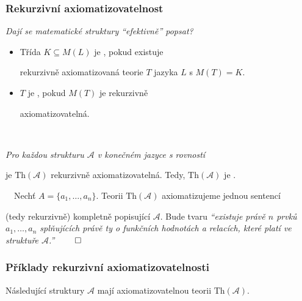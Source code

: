 \subsubsection*{Rekurzivní axiomatizovatelnost}
    {\it Dají se matematické struktury ``efektivně'' popsat?}
    \smallskip
    
    \begin{itemize}
    \item Třída $K\subseteq M(L)$ je , pokud existuje
    \smallskip
    
    rekurzivně axiomatizovaná teorie $T$ jazyka $L$ s $M(T)=K$.
    \smallskip
    
    \item {} $T$ je , pokud $M(T)$ je
    rekurzivně
    \smallskip
    
    axiomatizovatelná.
    \end{itemize}
    
    \medskip
    
    \smallskip
    
    {\bf {}}\ \ {\it Pro každou  strukturu $\mathcal{A}$ v konečném jazyce s rovností
    \smallskip
    
    je $\mathrm{Th}(\mathcal{A})$ rekurzivně axiomatizovatelná. Tedy, $\mathrm{Th}(\mathcal{A})$ je .}
    \medskip
    
    \smallskip
    
    {\it {}}\ \ Nechť $A=\{a_1,\dots,a_n\}$. Teorii $\mathrm{Th}(\mathcal{A})$ axiomatizujeme jednou sentencí
    \smallskip
    
    (tedy rekurzivně) kompletně popisující $\mathcal{A}$. Bude tvaru \emph{``existuje právě $n$ prvků   
    $a_1,\dots,a_n$ splňujících právě ty  o funkčních hodnotách a relacích, které platí ve struktuře $\mathcal{A}$.''} $\qed$
    
    
    \subsubsection*{Příklady rekurzivní axiomatizovatelnosti}
    Následující struktury $\mathcal{A}$ mají  axiomatizovatelnou teorii $\mathrm{Th}(\mathcal{A})$.
    \medskip
    
